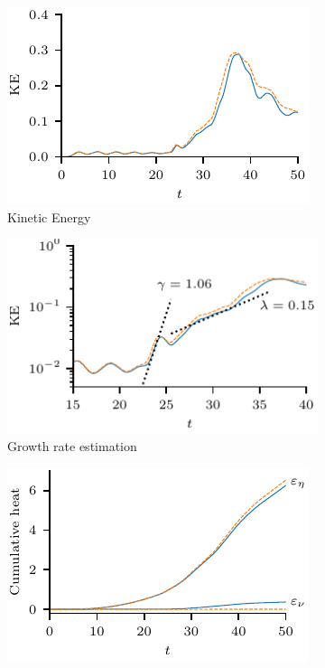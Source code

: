 \documentclass[fleqn,usenatbib]{mnras}
\begin{document}
\begin{figure}
  \centering
    \begin{subfigure}{0.32\textwidth}
      \includegraphics[width=\linewidth]{kinetic_energy-3.pdf}
      \caption{Kinetic Energy}
      \label{fig:kink_ke-3}
    \end{subfigure}
    \hfill
    \begin{subfigure}{0.32\textwidth}
      \includegraphics[width=\linewidth]{kinetic_energy_log-3.pdf}
      \caption{Growth rate estimation}
      \label{fig:kink_ke_log-3}
    \end{subfigure}
    \hfill
    \begin{subfigure}{0.32\textwidth}
      \includegraphics[width=\linewidth]{heating_r-3.pdf}

\end{subfigure}
\end{figure}
\end{document}
